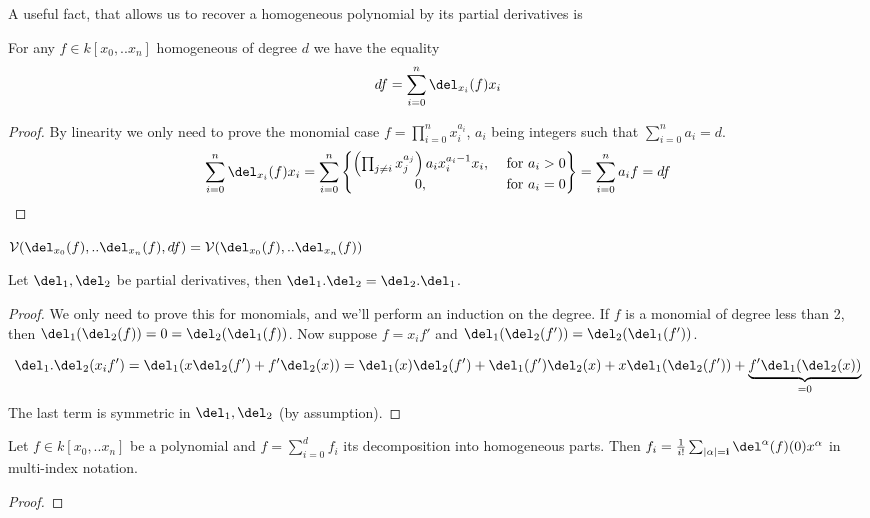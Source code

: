 A useful fact, that allows us to recover a homogeneous polynomial by its partial derivatives is

\begin{proposition}
For any $f \in k[x_0,..x_n]$ homogeneous of degree $d$ we have the equality
\[ df = \sum_{i=0}^n \del_{x_i}(f)x_i \]
\end{proposition}
\begin{proof}
By linearity we only need to prove the monomial case $f = \prod_{i=0}^n x_i^{a_i}$, $a_i$ being integers such that $\sum_{i=0}^n a_i = d$.
\begin{equation}
\sum_{i=0}^n \del_{x_i}(f)x_i
= \sum_{i=0}^n \begin{Bmatrix} \left(\prod_{j\neq i} x_j^{a_j}\right) a_i x_i^{a_i-1} x_i, & \text{ for } a_i > 0
\\ 0, &\text{ for } a_i = 0 \end{Bmatrix}
= \sum_{i=0}^n a_i f = df
\end{equation}
\end{proof}

\begin{corollary}
$\V(\del_{x_0}(f),..\del_{x_n}(f), df) = \V(\del_{x_0}(f),..\del_{x_n}(f))$
\end{corollary}


\begin{lemma}
Let $\del_1,\del_2$ be partial derivatives, then $\del_1.\del_2 = \del_2.\del_1$.
\end{lemma}
\begin{proof}
We only need to prove this for monomials, and we'll perform an induction on the degree.
If $f$ is a monomial of degree less than 2, then $\del_1(\del_2(f)) = 0 = \del_2(\del_1(f))$. 
Now suppose $f = x_if'$ and $\del_1(\del_2(f')) = \del_2(\del_1(f'))$.

\begin{equation}
\del_1.\del_2(x_if') = \del_1(x\del_2(f') + f'\del_2(x)) = 
\del_1(x)\del_2(f') + \del_1(f')\del_2(x) + x\del_1(\del_2(f')) + \underset{=0}{\underbrace{f'\del_1(\del_2(x))}}
\end{equation}
The last term is symmetric in $\del_1,\del_2$ (by assumption).
\end{proof}

\begin{corollary}
Let $f \in k[x_0,..x_n]$ be a polynomial and $f = \sum_{i=0}^d f_i$ its decomposition into homogeneous parts.
Then $f_i = \frac{1}{i!} \sum_{|\bf{\alpha}|=i} \del^{\bf{\alpha}}(f)(0)x^{\bf{\alpha}}$ in multi-index notation.
\end{corollary}
\begin{proof}
\end{proof}





